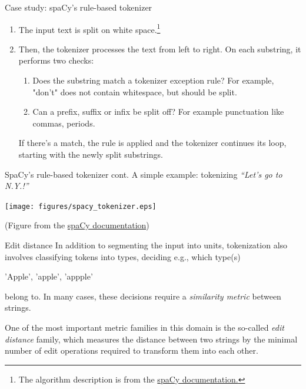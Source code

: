 \documentclass[style=upen, size=14pt]{powerdot}
\newcommand{\gold}{\color{arany}}
\theoremstyle{definition}
\begin{document}
\begin{slide}[toc=spaCy]{Case study: spaCy's rule-based tokenizer}

  \begin{enumerate}
  \item The input text is split on white space.\footnote{The algorithm
    description is from the
    \href{https://spacy.io/usage/linguistic-features\#tokenization}{spaCy
      documentation.}}
  \item Then, the tokenizer processes the text from left to right. On each
    substring, it performs two checks:
    \begin{enumerate}
    \item Does the substring match a tokenizer exception rule? For example,
      "don't" does not contain whitespace, but should be split.
    \item Can a prefix, suffix or infix be split off? For example punctuation
      like commas, periods.
    \end{enumerate}
    If there's a match, the rule is applied and the tokenizer continues
    its loop, starting with the newly split substrings.
  \end{enumerate}

\end{slide}

\begin{slide}[toc=]{SpaCy's rule-based tokenizer cont.}
  A simple example: tokenizing \emph{``Let's go to N.Y.!''}
    \begin{center}
      \texttt{[image: figures/spacy\_tokenizer.eps]}\
      
      \footnotesize{(Figure from the \href{https://spacy.io/usage/linguistic-features\#tokenization}{spaCy documentation})}
    \end{center}
\end{slide}

\begin{slide}[toc=Edit distance]{Edit distance}
  In addition to segmenting the input into units, tokenization also involves
  classifying tokens into types, deciding e.g., which type(s)\smallskip
  \begin{center}
    'Apple', 'apple', 'appple'\smallskip
  \end{center}
  belong to. In many cases, these decisions require a \emph{similarity metric}
  between strings.

  One of the most important metric families in this domain is the so-called
  \emph{\gold edit distance} family, which measures the distance between two
  strings by the minimal number of edit operations required to transform them
  into each other.
\end{slide}
\end{document}

